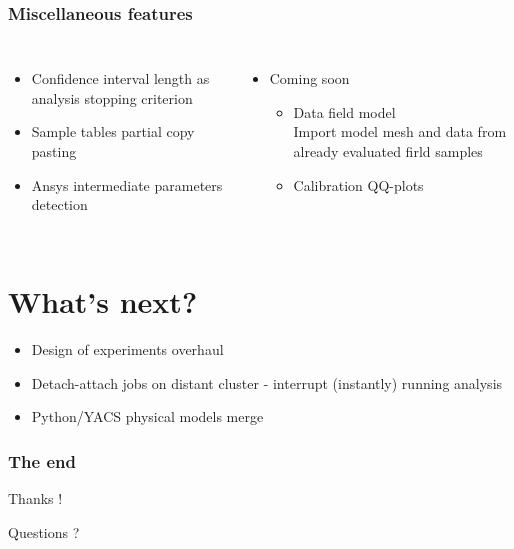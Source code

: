 \documentclass[aspectratio=169]{beamer}
\begin{document}
\begin{frame}
  \frametitle{Miscellaneous features}
    \begin{columns}
    \begin{itemize}
    \item Confidence interval length as analysis stopping criterion
    \item Sample tables partial copy pasting
    \item Ansys intermediate parameters detection
    \end{itemize}
    \vspace{30px}
    \begin{itemize}
    \item Coming soon
      \begin{itemize}
      \item Data field model \\
        Import model mesh and data from already evaluated firld samples
      \item Calibration QQ-plots
      \end{itemize}
    \end{itemize}
  \end{columns}
\end{frame}


\section{What's next?}
\begin{frame}
  \begin{itemize}
  \item Design of experiments overhaul
  \item Detach-attach jobs on distant cluster - interrupt (instantly) running analysis
  \item Python/YACS physical models merge
  \end{itemize}
\end{frame}

\begin{frame}
\frametitle{The end}
\begin{center}
Thanks !
\end{center}

\begin{center}
Questions ?
\end{center}

\end{frame}


\end{document}
